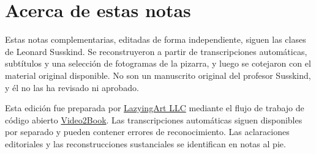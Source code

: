 \documentclass[11pt,oneside]{book}
\begin{document}
\frontmatter
\hypersetup{pageanchor=false}

\hypersetup{pageanchor=true}

\clearpage
\chapter{Acerca de estas notas}
Estas notas complementarias, editadas de forma independiente, siguen las clases de Leonard Susskind. Se reconstruyeron a partir de transcripciones automáticas, subtítulos y una selección de fotogramas de la pizarra, y luego se cotejaron con el material original disponible. No son un manuscrito original del profesor Susskind, y él no las ha revisado ni aprobado.

Esta edición fue preparada por \href{https://lazying.art}{LazyingArt LLC} mediante el flujo de trabajo de código abierto \href{https://github.com/lachlanchen/Video2Book}{Video2Book}. Las transcripciones automáticas siguen disponibles por separado y pueden contener errores de reconocimiento. Las aclaraciones editoriales y las reconstrucciones sustanciales se identifican en notas al pie.
\clearpage
\tableofcontents
\mainmatter










\end{document}
